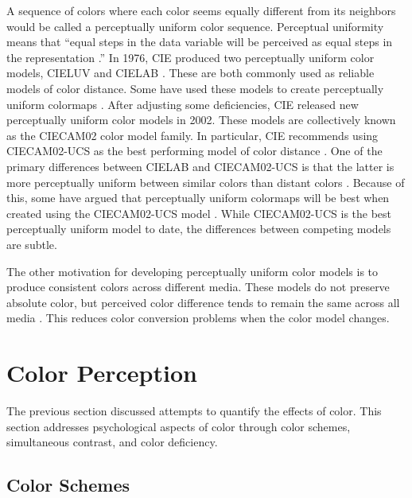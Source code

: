 \documentclass[journal,12pt]{IEEEtran}
\begin{document}
A sequence of colors where each color seems equally different from its neighbors
would be called a perceptually uniform color sequence. Perceptual uniformity means that
``equal steps in the data variable will be perceived as equal steps in the representation \cite{endofrainbow}.''
In 1976, CIE produced two perceptually uniform color models, CIELUV and CIELAB \cite{colorimetry}.
These are both commonly used as reliable models of color distance. Some have used these models
to create perceptually uniform colormaps \cite{viridis,matlab}.
After adjusting some deficiencies, CIE
released new perceptually uniform color models in 2002. These models are collectively known as 
the CIECAM02 color model family. In particular, CIE recommends using CIECAM02-UCS as the best
performing model of color distance \cite{ciecam02}.
One of the primary differences between CIELAB and CIECAM02-UCS is that the latter
is more perceptually uniform between similar colors than distant colors \cite{ciecam02}.
Because of this, some have argued that
perceptually uniform colormaps will be best when created using the CIECAM02-UCS model \cite{viridis}.
While CIECAM02-UCS is the best perceptually uniform model to date, the differences between competing models are subtle.

The other motivation for developing perceptually
uniform color models is to produce consistent colors across different media.
These models do not preserve absolute color, but perceived color difference tends
to remain the same across all media \cite{ciecam02}.
This reduces color conversion problems when the color model changes.

\section{Color Perception}

The previous section discussed attempts to quantify the effects of color.
This section addresses psychological aspects of color through color schemes,
simultaneous contrast, and color deficiency.

\subsection{Color Schemes}
\end{document}
